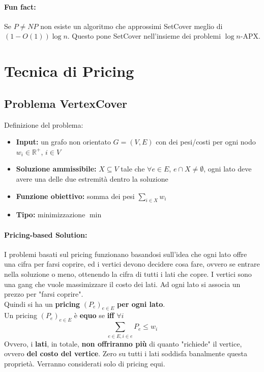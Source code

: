 \documentclass[11pt]{article}
\begin{document}
	\paragraph{Fun fact:} Se $P \neq NP$ non esiste un algoritmo che approssimi SetCover meglio di $(1 - O(1)) \log n$. Questo pone SetCover nell'insieme dei problemi $\log n$-APX.\\
	
	\newpage
	
	\section{Tecnica di Pricing}
	
	\subsection{Problema VertexCover}
	
	Definizione del problema: 
	\begin{itemize}
		\item \textbf{Input:} un grafo non orientato $G =(V,E)$ con dei pesi/costi per ogni nodo $w_i \in \mathbb{R}^+$, $i \in V$
		\item \textbf{Soluzione ammissibile:} $X \subseteq V$ tale che $\forall e \in E$, $e \cap X \neq \emptyset$, ogni lato deve avere una delle due estremità dentro la soluzione
		\item \textbf{Funzione obiettivo:} somma dei pesi $\sum_{i \in X} w_i$
		\item \textbf{Tipo:} minimizzazione $\min$
	\end{itemize}
	
	\paragraph{Pricing-based Solution:} I problemi basati sul pricing funzionano basandosi sull'idea che ogni lato offre una cifra per farsi coprire, ed i vertici devono decidere cosa fare, ovvero se entrare nella soluzione o meno, ottenendo la cifra di tutti i lati che copre. I vertici sono una gang che vuole massimizzare il costo dei lati. Ad ogni lato si associa un prezzo per "farsi coprire".\\
	Quindi si ha un \textbf{pricing} $(P_e)_{e \in E}$ \textbf{per ogni lato}.\\
	
	Un pricing $(P_e)_{e \in E}$ è \textbf{equo} se \textbf{iff} $\forall i$
	$$ \sum_{e \in E, i \in e} P_e \leq w_i $$
	Ovvero, i \textbf{lati}, in totale, \textbf{non offriranno più} di quanto "richiede" il vertice, ovvero \textbf{del costo del vertice}. Zero su tutti i lati soddisfa banalmente questa proprietà. Verranno considerati solo di pricing equi.\\
	
\end{document}
